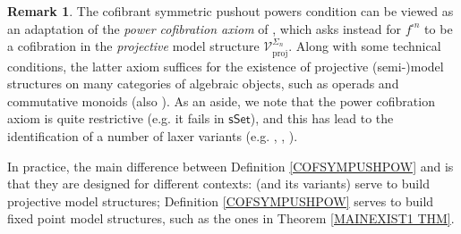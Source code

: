\documentclass[a4paper,10pt
,draft
]{article}%
\numberwithin{equation}{section}
\numberwithin{figure}{section}
\theoremstyle{definition} %
\newtheorem{remark}[equation]{Remark}%
\newcommand{\V}{\ensuremath{\mathcal V}}
\newcommand{\1}{\ensuremath{\mathbbm 1}}%
\begin{document}
\begin{remark}\label{CSPP_REM}
	The cofibrant symmetric pushout powers condition
	can be viewed as an adaptation of 
	the \textit{power cofibration axiom} of 
	\cite[Def. 4.5.4.2(iii)]{Lur17},
	which asks instead for 
	$f^{\square n}$
	to be a cofibration
	in the \textit{projective} model structure $\V^{\Sigma_n}_{\text{proj}}$.
	Along with some technical conditions,
	the latter axiom suffices for the existence
	of projective (semi-)model structures
	on many categories of algebraic objects,
	such as operads and commutative monoids \cite[Prop. 4.5.4.6]{Lur17} (also \cite[Prop. 6.2.2, Thm. 6.2.3]{WY18}).
	As an aside, we note that the 
	power cofibration axiom
	is quite restrictive (e.g. it fails in $\mathsf{sSet}$),
	and this has lead to the identification of a number of laxer variants
	(e.g. 
	\cite[Def. 3.1]{Wh17},
	\cite[Thm. 6.1.1]{WY18},
	\cite[Def. 2.1]{PS18b}).
	
	
	In practice, the main difference between 
	Definition \ref{COFSYMPUSHPOW} and 
	\cite[Def. 4.5.4.2(iii)]{Lur17}
	is that they are designed for different contexts:
	\cite[Def. 4.5.4.2(iii)]{Lur17}
	(and its variants) serve to build projective model structures;
	Definition \ref{COFSYMPUSHPOW} 
	serves to build fixed point model structures,
	such as the ones in Theorem \ref{MAINEXIST1 THM}.
	

      

\end{remark}
\end{document}
